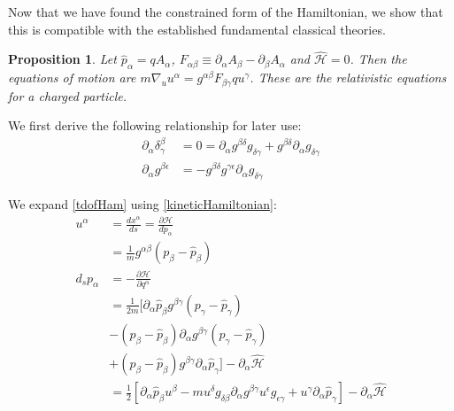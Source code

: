 \documentclass[aps,pra,10pt,twocolumn,floatfix,nofootinbib]{revtex4-1}
\newtheorem{prop}[thm]{Proposition}
\theoremstyle{definition}
\begin{document}
Now that we have found the constrained form of the Hamiltonian, we show that this is compatible with the established fundamental classical theories.

\begin{prop}\label{relativisticEM}
Let $\hat{p}_\alpha = q A_\alpha$, $F_{\alpha \beta} \equiv \partial_\alpha A_\beta - \partial_\beta A_\alpha$ and $\hat{\mathcal{H}} = 0$. Then the equations of motion are $m \nabla_u u^\alpha = g^{\alpha\beta} F_{\beta \gamma} q u^\gamma$. These are the relativistic equations for a charged particle.
\end{prop}

We first derive the following relationship for later use:
\begin{align*}
\partial_\alpha \delta^\beta_\gamma &= 0 = \partial_\alpha g^{\beta\delta} g_{\delta\gamma} + g^{\beta\delta} \partial_\alpha g_{\delta\gamma}\\
\partial_\alpha g^{\beta\epsilon} &= - g^{\beta\delta} g^{\gamma\epsilon} \partial_\alpha g_{\delta\gamma}
\end{align*}

We expand \ref{tdofHam} using \ref{kineticHamiltonian}:
\begin{align*}
u^\alpha &= \frac{dx^\alpha}{ds} = \frac{\partial \mathcal{H}}{dp_\alpha} \\
&= \frac{1}{m}g^{\alpha\beta}(p_\beta-\hat{p}_\beta) \\
d_s p_\alpha &= - \frac{\partial \mathcal{H}}{\partial q^\alpha} \\
&=\frac{1}{2m}[\partial_\alpha \hat{p}_\beta g^{\beta \gamma} (p_\gamma -\hat{p}_\gamma) \\
 &- (p_\beta -\hat{p}_\beta) \partial_\alpha g^{\beta \gamma} (p_\gamma -\hat{p}_\gamma) \\
 &+ (p_\beta -\hat{p}_\beta) g^{\beta \gamma} \partial_\alpha \hat{p}_\gamma ]- \partial_\alpha \hat{\mathcal{H}} \\
&=\frac{1}{2}[\partial_\alpha \hat{p}_\beta u^\beta
- m u^\delta g_{\delta\beta} \partial_\alpha g^{\beta \gamma} u^\epsilon g_{\epsilon\gamma}
+ u^\gamma \partial_\alpha \hat{p}_\gamma ]- \partial_\alpha \hat{\mathcal{H}}
\end{align*}
\end{document}
